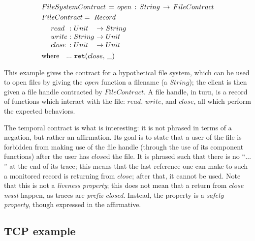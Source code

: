 \begin{align*}
 &FileSystemContract\, =\, open\, :\, String\, \to\, FileContract \\
 &FileContract =~ Record \\
 &\begin{array}{ @{\quad~}l@{\ :} @{~}l@{\ \to\ } l }
  read & Unit & String \\
  write & String & Unit \\
  close & Unit & Unit
 \end{array} \\
 &\text{where}\quad \sddd~ \ret{close}
\end{align*}

This example gives the contract for a hypothetical file system, which can be used to open files by giving the $open$ function a filename (a $String$); the client is then given a file handle contracted by $FileContract$.
%
A file handle, in turn, is a record of functions which interact with the file: $read$, $write$, and $close$, all which perform the expected behaviors.

The temporal contract is what is interesting: it is not phrased in terms of a negation, but rather an affirmation.
%
Its goal is to state that a user of the file is forbidden from making use of the file handle (through the use of its component functions) after the user has $close$d the file.
%
It is phrased such that there is no ``${\tt ...}$'' at the end of its trace; this means that the last reference one can make to such a monitored record is returning from $close$; after that, it cannot be used.
%
Note that this is not a \emph{liveness property}; this does not mean that a return from $close$ \emph{must} happen, as traces are \emph{prefix-closed}.
%
Instead, the property is a \emph{safety property}, though expressed in the affirmative.

\subsection{TCP example} \label{sec:tcp}

